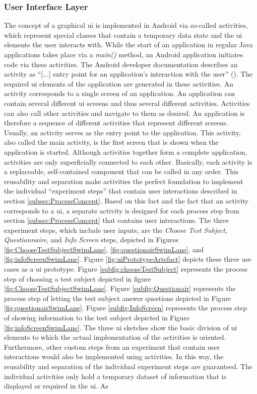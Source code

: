 \subsubsection{User Interface Layer}

The concept of a graphical \ac{ui} is implemented in Android via so-called activities, which represent special classes that contain a temporary data state and the \ac{ui} elements the user interacts with. While the start of an application in regular Java applications takes place via a \textit{main()} method, an Android application initiates code via these activities. The Android developer documentation describes an activity as \enquote{[...] entry point for an application's interaction with the user} (\cite{Google.2023}). The required \ac{ui} elements of the application are generated in these activities. An activity corresponds to a single screen of an application. An application can contain several different \ac{ui} screens and thus several different activities. Activities can also call other activities and navigate to them as desired. An application is therefore a sequence of different activities that represent different screens. Usually, an activity serves as the entry point to the application. This activity, also called the main activity, is the first screen that is shown when the application is started. Although activities together form a complete application, activities are only superficially connected to each other. Basically, each activity is a replaceable, self-contained component that can be called in any order. This reusability and separation make activities the perfect foundation to implement the individual \enquote{experiment steps} that contain user interactions described in section \ref{subsec:ProcessConcept}. Based on this fact and the fact that an activity corresponds to a \ac{ui}, a separate activity is designed for each process step from section \ref{subsec:ProcessConcept} that contains user interactions. The three experiment steps, which include user inputs, are the \textit{Choose Test Subject}, \textit{Questionnaire}, and \textit{Info Screen} steps, depicted in Figures \ref{fig:ChooseTestSubjectSwimLane}, \ref{fig:questionairSwimLane}, and \ref{fig:infoScreenSwimLane}. Figure \ref{fig:uiPrototypeArtefact} depicts these three use cases as a \ac{ui} prototype. Figure \ref{subfig:chooseTestSubject} represents the process step of choosing a test subject depicted in figure \ref{fig:ChooseTestSubjectSwimLane}. Figure \ref{subfig:Questionair} represents the process step of letting the test subject answer questions depicted in Figure \ref{fig:questionairSwimLane}. Figure \ref{subfig:InfoScreen} represents the process step of showing information to the test subject depicted in Figure \ref{fig:infoScreenSwimLane}. The three \ac{ui} sketches show the basic division of \ac{ui} elements to which the actual implementation of the activities is oriented. Furthermore, other custom steps from an experiment that contain user interactions would also be implemented using activities. In this way, the reusability and separation of the individual experiment steps are guaranteed. The individual activities only hold a temporary dataset of information that is displayed or required in the \ac{ui}. As 